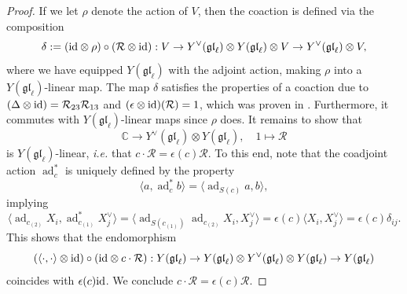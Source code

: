 \documentclass[11pt]{report}
\newtheorem{lemma}[theorem]{Lemma}
\theoremstyle{definition}
\theoremstyle{remark}
\theoremstyle{remark}
\newcommand{\End}{\operatorname{End}}
\newcommand{\id}{\textnormal{id}}
\newcommand{\C}{\mathbb{C}}
\begin{document}
\begin{proof}
If we let $\rho$ denote the action of $V$, then the coaction is defined via the composition
\begin{equation*}
\delta := (\id \otimes \rho) \circ (\mathcal{R} \otimes \id): V \to Y^\vee(\mathfrak{gl}_\ell) \otimes Y(\mathfrak{gl}_\ell) \otimes V \to Y^\vee(\mathfrak{gl}_\ell) \otimes V,
\end{equation*}
where we have equipped $Y(\mathfrak{gl}_\ell)$ with the adjoint action, making $\rho$ into a $Y(\mathfrak{gl}_\ell)$-linear map. The map $\delta$ satisfies the properties of a coaction due to $(\Delta \otimes \id) = \mathcal{R}_{23} \mathcal{R}_{13}$ and $(\epsilon \otimes \id)(\mathcal{R}) = 1$, which was proven in \cite{article:nazarov:2019}. Furthermore, it commutes with $Y(\mathfrak{gl}_\ell)$-linear maps since $\rho$ does. It remains to show that
\begin{equation*}
\C \to Y^\vee(\mathfrak{gl}_\ell) \otimes Y(\mathfrak{gl}_\ell), \quad 1 \mapsto \mathcal{R}
\end{equation*}
is $Y(\mathfrak{gl}_\ell)$-linear, \emph{i.e.} that $c \cdot \mathcal{R} = \epsilon(c) \mathcal{R}$. To this end, note that the coadjoint action $\operatorname{ad}_c^*$ is uniquely defined by the property
\begin{equation*}
\langle a,\operatorname{ad}_c^* b \rangle = \langle \operatorname{ad}_{S(c)} a,b \rangle,
\end{equation*}
implying
\begin{equation*}
\langle \operatorname{ad}_{c_{(2)}} X_i, \operatorname{ad}_{c_{(1)}}^* X_j^\vee \rangle = \langle \operatorname{ad}_{S(c_{(1)})} \operatorname{ad}_{c_{(2)}} X_i, X_j^\vee \rangle = \epsilon(c) \langle X_i,X_j^\vee \rangle = \epsilon(c) \delta_{ij}.
\end{equation*}
This shows that the endomorphism
\begin{equation*}
(\langle \cdot,\cdot \rangle \otimes \id) \circ (\id \otimes c \cdot \mathcal{R}): Y(\mathfrak{gl}_\ell) \to Y(\mathfrak{gl}_\ell) \otimes Y^\vee(\mathfrak{gl}_\ell) \otimes Y(\mathfrak{gl}_\ell) \to Y(\mathfrak{gl}_\ell)
\end{equation*}
coincides with $\epsilon(c) \id$. We conclude $c \cdot \mathcal{R} = \epsilon(c) \mathcal{R}$.
\end{proof}

%
\end{document}
